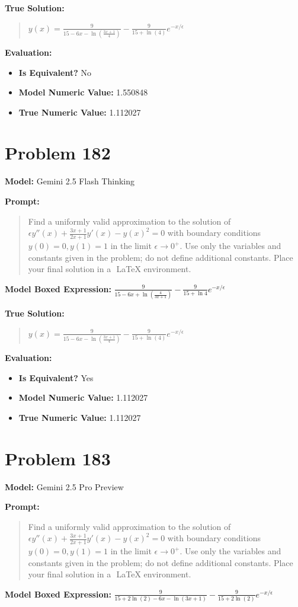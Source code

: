 \documentclass{article}
\begin{document}
{\textbf{True Solution:}
\begin{quote}
$y(x)=\frac{9}{15-6x-\ln(\frac{3x+1}{4})}-\frac{9}{15+\ln(4)}e^{-x/\epsilon}$
\end{quote}

\textbf{Evaluation:}
\begin{itemize}
\item \textbf{Is Equivalent?} No
\item \textbf{Model Numeric Value:} 1.550848
\item \textbf{True Numeric Value:} 1.112027
\end{itemize}
\vspace{1cm}
\section*{Problem 182}
\textbf{Model:} Gemini 2.5 Flash Thinking

\textbf{Prompt:}
\begin{quote}
Find a uniformly valid approximation to the solution of $\epsilon y''(x) + \frac{3x+1}{2x+1}y'(x) - y(x)^{2} = 0$ with boundary conditions $y(0)=0, y(1)=1$ in the limit $\epsilon \to 0^+$. Use only the variables and constants given in the problem; do not define additional constants. Place your final solution in a $\boxed{}$ LaTeX environment.
\end{quote}
\textbf{Model Boxed Expression:} $\frac{9}{15-6x + \ln\left(\frac{4}{3x+1}\right)} - \frac{9}{15+\ln 4}e^{-x/\epsilon}$

\textbf{True Solution:}
\begin{quote}
$y(x)=\frac{9}{15-6x-\ln(\frac{3x+1}{4})}-\frac{9}{15+\ln(4)}e^{-x/\epsilon}$
\end{quote}

\textbf{Evaluation:}
\begin{itemize}
\item \textbf{Is Equivalent?} Yes
\item \textbf{Model Numeric Value:} 1.112027
\item \textbf{True Numeric Value:} 1.112027
\end{itemize}
\vspace{1cm}
\section*{Problem 183}
\textbf{Model:} Gemini 2.5 Pro Preview

\textbf{Prompt:}
\begin{quote}
Find a uniformly valid approximation to the solution of $\epsilon y''(x) + \frac{3x+1}{2x+1}y'(x) - y(x)^{2} = 0$ with boundary conditions $y(0)=0, y(1)=1$ in the limit $\epsilon \to 0^+$. Use only the variables and constants given in the problem; do not define additional constants. Place your final solution in a $\boxed{}$ LaTeX environment.
\end{quote}
\textbf{Model Boxed Expression:} $\frac{9}{15+2\ln(2)-6x-\ln(3x+1)} - \frac{9}{15+2\ln(2)}e^{-x/\epsilon}$

}
\end{document}
